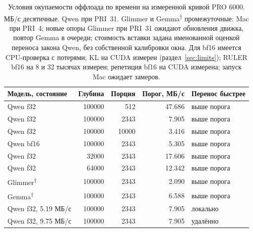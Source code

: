 \begin{table}[t]
\centering
\caption{Условия окупаемости оффлоада по времени на измеренной кривой PRO 6000. МБ/с десятичные.
Qwen при PRI~31. Glimmer и Gemma\textsuperscript{†} промежуточные: Mac при PRI~4; новые опоры Glimmer при PRI~31 ожидают обновления движка, повтор Gemma в очереди;
стоимость вставки задана именованной оценкой переноса закона Qwen, без собственной калибровки окна.
Для bf16 имеется CPU-проверка с потерями; KL на CUDA измерен (раздел~\ref{sec:limits}); RULER bf16 на 8 и 32 тысячах измерен; репетиция bf16 на CUDA измерена; запуск Mac ожидает замеров.}
\label{tab:when-pays-methods}
\footnotesize
\begin{tabular}{lrrrl}
\toprule
Модель, состояние & Глубина & Порция & Порог, МБ/с & Перенос быстрее \\
\midrule
Qwen f32 & 100000 & 512 & 47.686 & выше порога \\
Qwen f32 & 100000 & 2343 & 7.905 & выше порога \\
Qwen f32 & 100000 & 10000 & 3.416 & выше порога \\
Qwen bf16 & 100000 & 2343 & 5.305 & выше порога \\
Qwen f32 & 32000 & 2343 & 17.606 & выше порога \\
Qwen f32 & 64000 & 2343 & 12.342 & выше порога \\
Glimmer\textsuperscript{†} & 100000 & 2343 & 2.090 & выше порога \\
Gemma\textsuperscript{†} & 100000 & 2343 & 6.588 & выше порога \\
Qwen f32, 5.19 МБ/с & 100000 & 2343 & 7.905 & локально \\
Qwen f32, 9.75 МБ/с & 100000 & 2343 & 7.905 & удалённо \\
\bottomrule
\end{tabular}
\end{table}
